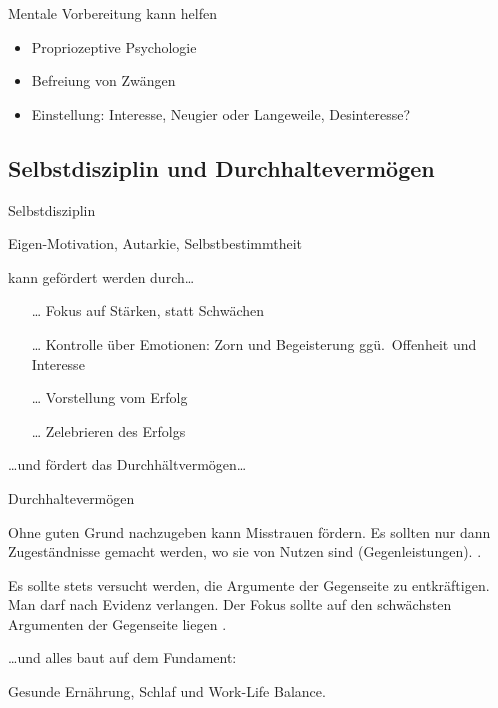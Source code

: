 \begin{frame}

  Mentale Vorbereitung kann helfen \cite{wannenwetsch_erfolgreicher_2009}

  \begin{itemize}
    \item Propriozeptive Psychologie \cite[][p. 37ff]{mccarthy_advanced_2015}
    \item Befreiung von Zwängen
    \item Einstellung: Interesse, Neugier oder Langeweile, Desinteresse?
  \end{itemize}

\end{frame}


\subsection{Selbstdisziplin und Durchhaltevermögen}

\begin{frame}{Selbstdisziplin}

  Eigen-Motivation, Autarkie, Selbstbestimmtheit

  kann gefördert werden durch\ldots
  \begin{itemize}
    \item[\ldots]Fokus auf Stärken, statt Schwächen 
    \item[\ldots]Kontrolle über Emotionen: Zorn und Begeisterung ggü. Offenheit und Interesse
    \item[\ldots]Vorstellung vom Erfolg 
    \item[\ldots]Zelebrieren des Erfolgs 
  \end{itemize}

  \ldots und fördert das Durchhältvermögen\ldots

\end{frame}

\begin{frame}{Durchhaltevermögen}

Ohne guten Grund nachzugeben kann Misstrauen fördern. Es sollten nur dann Zugeständnisse gemacht werden, wo sie von Nutzen sind (Gegenleistungen). \cites{obermeier_karrieresprung_nodate}[ch. 4.5.2]{helmold_verhandlungskonzepte_2019}.

  Es sollte stets versucht werden, die Argumente der Gegenseite zu entkräftigen. Man darf nach Evidenz verlangen. Der Fokus sollte auf den schwächsten Argumenten der Gegenseite liegen \cite[][ch. 4.5.2]{helmold_verhandlungskonzepte_2019}.

\end{frame}

\begin{frame}

  \ldots und alles baut auf dem Fundament:
  
  Gesunde Ernährung, Schlaf und Work-Life Balance.

\end{frame}


